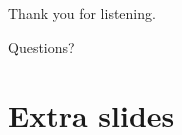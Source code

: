 \documentclass[10pt,show notes on second screen]{beamer}
\begin{document}
\begin{frame}
\begin{center}
Thank you for listening.
\end{center}
\vspace{5pt}
\begin{center}
Questions?
\end{center}
\end{frame}

\begin{frame}
\tiny

\end{frame}

\section{Extra slides}

\end{document}
